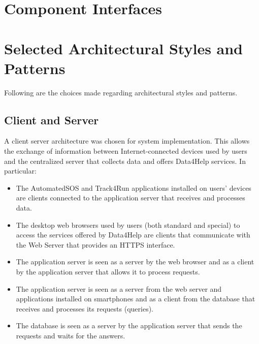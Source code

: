 \clearpage

\section{Component Interfaces}

\clearpage

\section{Selected Architectural Styles and Patterns}
Following are the choices made regarding architectural styles and patterns.

\subsection{Client and Server}
A client server architecture was chosen for system implementation.
This allows the exchange of information between Internet-connected devices used by users and the centralized server that collects data and offers Data4Help services.
In particular:
\begin{itemize}
  \item The AutomatedSOS and Track4Run applications installed on users' devices are clients connected to the application server that receives and processes data.
  \item The desktop web browsers used by users (both standard and special) to access the services offered by Data4Help are clients that communicate with the Web Server that provides an HTTPS interface.
  \item The application server is seen as a server by the web browser and as a client by the application server that allows it to process requests.
  \item The application server is seen as a server from the web server and applications installed on smartphones and as a client from the database that receives and processes its requests (queries).
  \item The database is seen as a server by the application server that sends the requests and waits for the answers.
\end{itemize}

